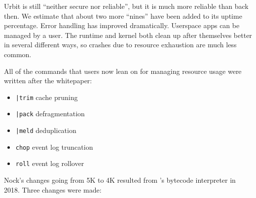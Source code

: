 \documentclass[twoside]{article}
\begin{document}
Urbit is still ``neither secure nor reliable'', but it is much more reliable than back then.  We estimate that about two more ``nines'' have been added to its uptime percentage.  Error handling has improved dramatically.  Userspace apps can be managed by a user.  The runtime and kernel both clean up after themselves better in several different ways, so crashes due to resource exhaustion are much less common.

All of the commands that users now lean on for managing resource usage were written after the whitepaper:
\begin{itemize}
  \item  \lstinline[style=inlinecode]{|trim} cache pruning
  \item  \lstinline[style=inlinecode]{|pack} defragmentation
  \item  \lstinline[style=inlinecode]{|meld} deduplication
  \item  \lstinline[style=inlinecode]{chop} event log truncation
  \item  \lstinline[style=inlinecode]{roll} event log rollover
\end{itemize}

Nock's changes going from 5K to 4K resulted from 's bytecode interpreter in 2018.  Three changes were made:
\end{document}

